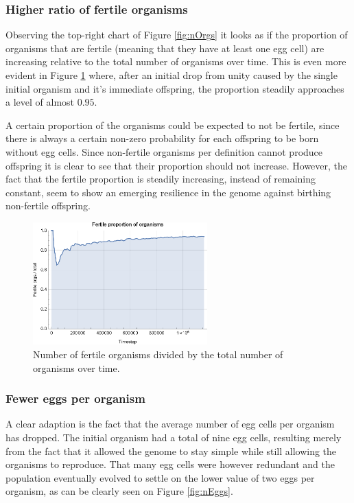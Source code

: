 \subsubsection{Higher ratio of fertile organisms}
Observing the top-right chart of Figure \ref{fig:nOrgs} it looks as if the proportion of organisms that are fertile (meaning that they have at least one egg cell) are increasing relative to the total number of organisms over time. This is even more evident in Figure \ref{fig:fertileProp} where, after an initial drop from unity caused by the single initial organism and it's immediate offspring, the proportion steadily approaches a level of almost \(0.95\).

A certain proportion of the organisms could be expected to not be fertile, since there is always a certain non-zero probability for each offspring to be born without egg cells. Since non-fertile organisms per definition cannot produce offspring it is clear to see that their proportion should not increase. However, the fact that the fertile proportion is steadily increasing, instead of remaining constant, seem to show an emerging resilience in the genome against birthing non-fertile offspring.

\begin{figure}
  \begin{center}
  \includegraphics[width=0.6\textwidth]{figure/fertileProp}
  \caption{
    Number of fertile organisms divided by the total number of organisms over time.
  }
  \label{fig:fertileProp}
  \end{center}
\end{figure}

\subsubsection{Fewer eggs per organism}
A clear adaption is the fact that the average number of egg cells per organism has dropped. The initial organism had a total of nine egg cells, resulting merely from the fact that it allowed the genome to stay simple while still allowing the organisms to reproduce. That many egg cells were however redundant and the population eventually evolved to settle on the lower value of two eggs per organism, as can be clearly seen on Figure \ref{fig:nEggs}. 

